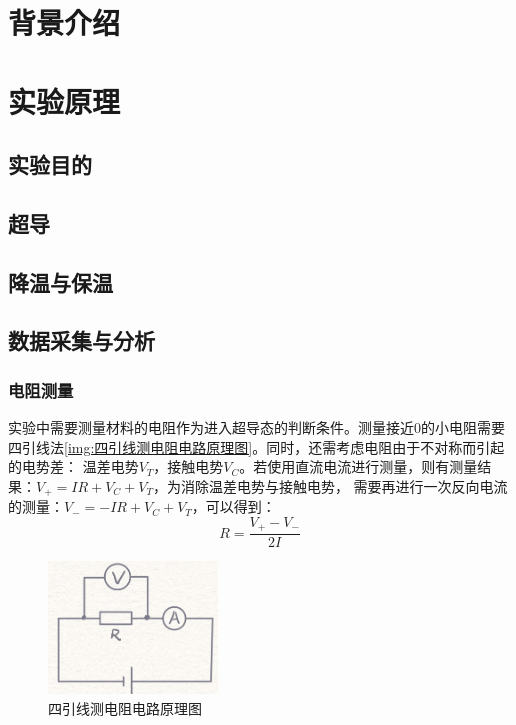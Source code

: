 \documentclass{spaexp}
\begin{document}
    \maketitle
    
    \section{背景介绍}
    \section{实验原理}
        \subsection{实验目的}
        \subsection{超导}
        \subsection{降温与保温}
        \subsection{数据采集与分析}
            \subsubsection{电阻测量}
            实验中需要测量材料的电阻作为进入超导态的判断条件。测量接近0的小电阻需要四引线法\autoref{img:四引线测电阻电路原理图}。同时，还需考虑电阻由于不对称而引起的电势差：
            温差电势$V_T$，接触电势$V_C$。若使用直流电流进行测量，则有测量结果：$V_+ = IR + V_C + V_T$，为消除温差电势与接触电势，
            需要再进行一次反向电流的测量：$V_- = -IR + V_C + V_T$，可以得到：
            \begin{equation}
                R = \frac{V_+ - V_-}{2I}
            \end{equation}
            \begin{figure}
                \ct
                \caption{四引线测电阻电路原理图}
                \label{img:四引线测电阻电路原理图}
                \includegraphics[width = 0.4\textwidth]{fourfoot.jpeg}
            \end{figure}
\end{document}
